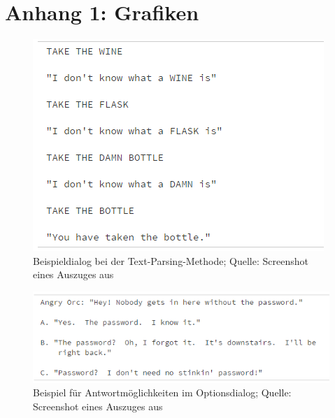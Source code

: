 \documentclass[12pt,twoside]{article}
\theoremstyle{plain}
\theoremstyle{definition}
\theoremstyle{remark}
\begin{document}
\newpage
{}
\section*{Anhang 1: Grafiken}
\begin{figure}[here]
\label{fig:ex_pars}
\includegraphics{images/dialogue.png}
\caption{Beispieldialog bei der Text-Parsing-Methode; Quelle: Screenshot eines Auszuges aus \cite{npcs}}
\end{figure}
\begin{figure}[here]
\includegraphics{images/options.png}
\caption{Beispiel für Antwortmöglichkeiten im Optionsdialog; Quelle: Screenshot eines Auszuges aus \cite{npcs}}
\end{figure}
\end{document}
